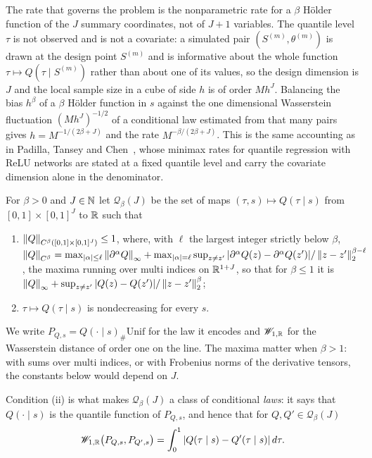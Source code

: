 The rate that governs the problem is the nonparametric rate for a $\beta$ H\"older function of the $J$ summary coordinates, not of $J+1$ variables. The quantile level $\tau$ is not observed and is not a covariate: a simulated pair $(S^{(m)},\theta^{(m)})$ is drawn at the design point $S^{(m)}$ and is informative about the whole function $\tau\mapsto Q(\tau\mid S^{(m)})$ rather than about one of its values, so the design dimension is $J$ and the local sample size in a cube of side $h$ is of order $Mh^J$. Balancing the bias $h^\beta$ of a $\beta$ H\"older function in $s$ against the one dimensional Wasserstein fluctuation $(Mh^J)^{-1/2}$ of a conditional law estimated from that many pairs gives $h=M^{-1/(2\beta+J)}$ and the rate $M^{-\beta/(2\beta+J)}$. This is the same accounting as in Padilla, Tansey and Chen~\cite{padilla2022}, whose minimax rates for quantile regression with ReLU networks are stated at a fixed quantile level and carry the covariate dimension alone in the denominator.

\begin{definition}\label{m:def:qclass}
For $\beta>0$ and $J\in\mathbb{N}$ let $\mathcal Q_\beta(J)$ be the set of maps $(\tau,s)\mapsto Q(\tau\mid s)$ from $[0,1]\times[0,1]^J$ to $\mathbb{R}$ such that
\begin{enumerate}[label=(\roman*),nosep]
\item $\left\|Q\right\|_{C^\beta([0,1]\times[0,1]^J)}\le1$, where, with $\ell$ the largest integer strictly below $\beta$, $\left\|Q\right\|_{C^\beta}=\max_{|\alpha|\le\ell}\left\|\partial^\alpha Q\right\|_\infty+\max_{|\alpha|=\ell}\sup_{z\ne z'}|\partial^\alpha Q(z)-\partial^\alpha Q(z')|/\left\|z-z'\right\|_2^{\beta-\ell}$, the maxima running over multi indices on $\mathbb{R}^{1+J}$, so that for $\beta\le1$ it is $\left\|Q\right\|_\infty+\sup_{z\ne z'}|Q(z)-Q(z')|/\left\|z-z'\right\|_2^\beta$;
\item $\tau\mapsto Q(\tau\mid s)$ is nondecreasing for every $s$.
\end{enumerate}
We write $P_{Q,s}=Q(\cdot\mid s)_\#\mathrm{Unif}$ for the law it encodes and $\mathscr{W}_{1,\mathbb{R}}$ for the Wasserstein distance of order one on the line. The maxima matter when $\beta>1$: with sums over multi indices, or with Frobenius norms of the derivative tensors, the constants below would depend on $J$.
\end{definition}

Condition (ii) is what makes $\mathcal Q_\beta(J)$ a class of conditional \emph{laws}: it says that $Q(\cdot\mid s)$ is the quantile function of $P_{Q,s}$, and hence that for $Q,Q'\in\mathcal Q_\beta(J)$
\begin{equation}\label{m:eq:quantileW1}
\mathscr{W}_{1,\mathbb{R}}\big(P_{Q,s},P_{Q',s}\big)=\int_0^1|Q(\tau\mid s)-Q'(\tau\mid s)|\,d\tau .
\end{equation}

